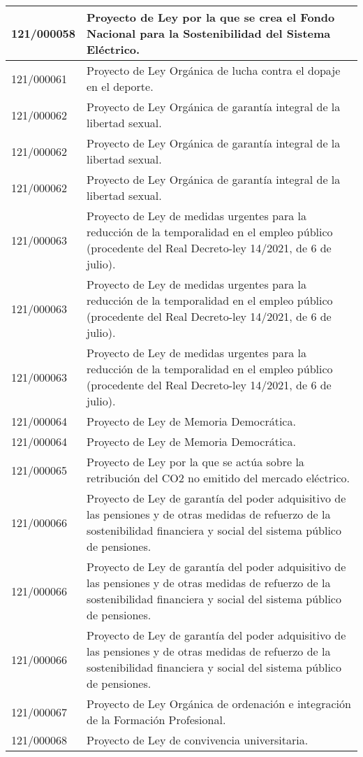 {\begin{table}[H]
\begin{center}
\begin{tabularx}{\linewidth}{| l | X |}
\hline
121/000058 & Proyecto de Ley por la que se crea el Fondo Nacional para la Sostenibilidad del Sistema Eléctrico. \\
\hline
121/000061 & Proyecto de Ley Orgánica de lucha contra el dopaje en el deporte. \\
\hline
121/000062 & Proyecto de Ley Orgánica de garantía integral de la libertad sexual. \\
\hline
121/000062 & Proyecto de Ley Orgánica de garantía integral de la libertad sexual. \\
\hline
121/000062 & Proyecto de Ley Orgánica de garantía integral de la libertad sexual. \\
\hline
121/000063 & Proyecto de Ley de medidas urgentes para la reducción de la temporalidad en el empleo público (procedente del Real Decreto-ley 14/2021, de 6 de julio). \\
\hline
121/000063 & Proyecto de Ley de medidas urgentes para la reducción de la temporalidad en el empleo público (procedente del Real Decreto-ley 14/2021, de 6 de julio). \\
\hline
121/000063 & Proyecto de Ley de medidas urgentes para la reducción de la temporalidad en el empleo público (procedente del Real Decreto-ley 14/2021, de 6 de julio). \\
\hline
121/000064 & Proyecto de Ley de Memoria Democrática. \\
\hline
121/000064 & Proyecto de Ley de Memoria Democrática. \\
\hline
121/000065 & Proyecto de Ley por la que se actúa sobre la retribución del CO2 no emitido del mercado eléctrico. \\
\hline
121/000066 & Proyecto de Ley de garantía del poder adquisitivo de las pensiones y de otras medidas de refuerzo de la sostenibilidad financiera y social del sistema público de pensiones. \\
\hline
121/000066 & Proyecto de Ley de garantía del poder adquisitivo de las pensiones y de otras medidas de refuerzo de la sostenibilidad financiera y social del sistema público de pensiones. \\
\hline
121/000066 & Proyecto de Ley de garantía del poder adquisitivo de las pensiones y de otras medidas de refuerzo de la sostenibilidad financiera y social del sistema público de pensiones. \\
\hline
121/000067 & Proyecto de Ley Orgánica de ordenación e integración de la Formación Profesional. \\
\hline
121/000068 & Proyecto de Ley de convivencia universitaria. \\

\end{tabularx}
\end{center}
\end{table}}
